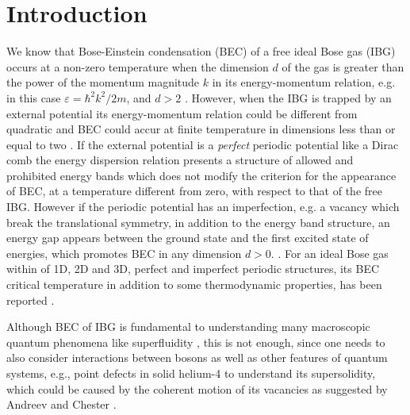 \documentclass[twocolumn,showpacs,showkeys,preprintnumbers,superscriptaddress, pra, 10pt, aps]{revtex4-2}
\begin{document}
\maketitle

\section{Introduction}

We know that Bose-Einstein condensation (BEC) of a free ideal Bose  gas (IBG) occurs at a non-zero temperature when the dimension $d$ of the gas is greater than the power of the
momentum magnitude $k$ in its energy-momentum relation, e.g. in this case $\varepsilon = \hbar^2 k^2 /2m$,
and  $d > 2$ \cite{Solis}. However, when
the IBG is trapped by an external potential its energy-momentum relation could be different from quadratic and BEC could accur at finite temperature in dimensions less
than or equal to two \cite{Faruk, Bagnato}. If the external potential is a {\it perfect} periodic potential like a Dirac comb
the energy dispersion relation presents a structure of allowed and prohibited energy bands which does not modify the criterion for the appearance of BEC, at a temperature different from zero, with respect to that of the free IBG. However if the periodic potential has an imperfection, e.g. a vacancy which break the translational symmetry, in addition to the energy band structure, an energy gap appears between the ground state and the first excited state of energies, which promotes BEC in any dimension $d>0$.  \cite{Guillermo}. For an ideal Bose gas within of 1D, 2D and 3D, perfect and imperfect periodic structures, its BEC critical temperature in addition to some thermodynamic properties, has been reported \cite{Juan-TM,Emilio-TL,Paty}.

Although BEC of IBG is fundamental to understanding many macroscopic quantum phenomena like superfluidity \cite{Halperin,Stringari}, this is not enough, since one needs to also consider interactions between bosons as well as other features of quantum systems, e.g., point defects in solid helium-4 to understand its supersolidity, which could be caused by the coherent motion of its vacancies as suggested by Andreev \cite{Andreev} and Chester \cite{Chester}.

\end{document}
